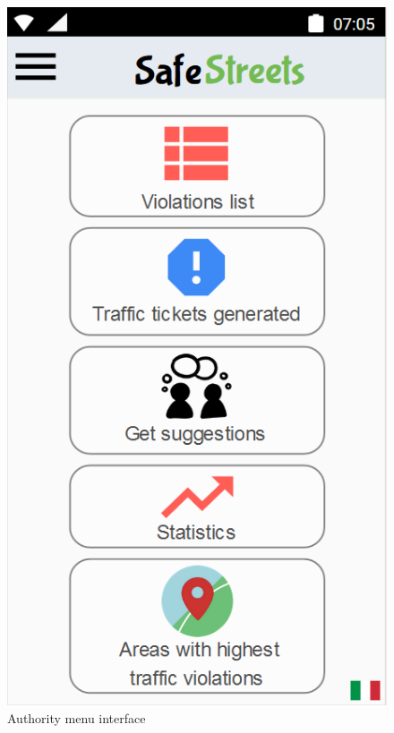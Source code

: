         \begin{figure}[h]
        \centering
        \includegraphics[scale=0.5]{Images/authority_menu.png}
        \caption{Authority menu interface}
    \end{figure}

